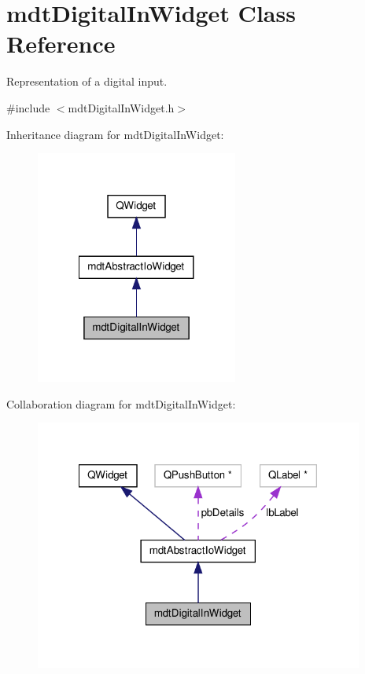 \hypertarget{classmdt_digital_in_widget}{\section{mdt\-Digital\-In\-Widget Class Reference}
\label{classmdt_digital_in_widget}
}


Representation of a digital input.  




{\ttfamily \#include $<$mdt\-Digital\-In\-Widget.\-h$>$}



Inheritance diagram for mdt\-Digital\-In\-Widget\-:\nopagebreak
\begin{figure}[H]
\begin{center}
\leavevmode
\includegraphics[width=188pt]{classmdt_digital_in_widget__inherit__graph}
\end{center}
\end{figure}


Collaboration diagram for mdt\-Digital\-In\-Widget\-:\nopagebreak
\begin{figure}[H]
\begin{center}
\leavevmode
\includegraphics[width=306pt]{classmdt_digital_in_widget__coll__graph}
\end{center}
\end{figure}
